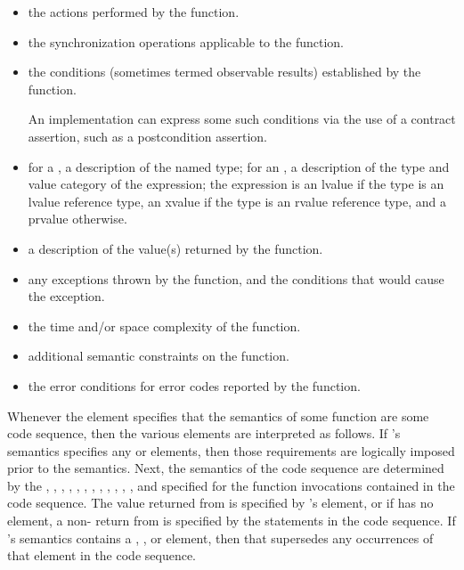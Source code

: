 \begin{itemize}
\item
\effects
the actions performed by the function.

\item
\sync
the synchronization operations applicable to the function.

\item
\ensures
the conditions (sometimes termed observable results)
established by the function.
\begin{example}
An implementation can express some such conditions
via the use of a contract assertion,
such as a postcondition assertion.
\end{example}

\item
\result
for a , a description of the named type;
for an ,
a description of the type and value category of the expression;
the expression is an lvalue if the type is an lvalue reference type,
an xvalue if the type is an rvalue reference type, and
a prvalue otherwise.

\item
\returns
a description of the value(s) returned by the function.

\item
\throws
any exceptions thrown by the function, and the conditions that would cause the exception.

\item
\complexity
the time and/or space complexity of the function.

\item
\remarks
additional semantic constraints on the function.

\item
\errors
the error conditions for error codes reported by the function.
\end{itemize}

\pnum
Whenever the  element specifies that the semantics of some function
 are  some code sequence, then the various elements are
interpreted as follows.
If 's semantics specifies any  or  elements,
then those requirements are logically imposed prior to the  semantics.
Next, the semantics of the code sequence are determined by the
,
,
,
,
,
,
,
,
,
,
,
, and
specified for the function invocations contained in the code sequence.
The value returned from  is specified by 's  element,
or if  has no  element,
a non- return from  is specified by the
 statements in the code sequence.
If 's semantics contains a ,
, or  element,
then that supersedes any occurrences of that element in the code sequence.

